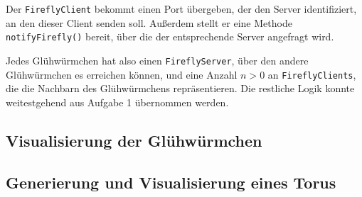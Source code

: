 \documentclass[12pt]{article}
\begin{document}
Der \texttt{FireflyClient} bekommt einen Port übergeben, der den Server identifiziert, an den dieser Client senden soll. Außerdem stellt er eine Methode \texttt{notifyFirefly()} bereit, über die der entsprechende Server angefragt wird.

Jedes Glühwürmchen hat also einen \texttt{FireflyServer}, über den andere Glühwürmchen es erreichen können, und eine Anzahl $n > 0$ an \texttt{FireflyClients}, die die Nachbarn des Glühwürmchens repräsentieren. Die restliche Logik konnte weitestgehend aus Aufgabe 1 übernommen werden.

\subsection*{Visualisierung der Glühwürmchen}

\subsection*{Generierung und Visualisierung eines Torus}
	
\end{document}
